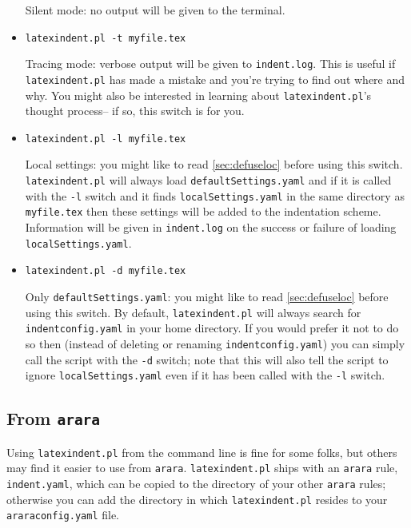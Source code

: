 \begin{itemize}[labelsep=.5cm]
	Silent mode: no output will be given to the terminal.
	\item[\verbitem{-t}] \lstinline!latexindent.pl -t myfile.tex!
														 		 		 		 		 					
	Tracing mode: verbose output will be given to \lstinline!indent.log!. This 
	is useful if \lstinline!latexindent.pl! has made a mistake and you're
	trying to find out where and why. You might also be interested in learning
    about \lstinline!latexindent.pl!'s thought process-- if so, this 
    switch is for you.
	\item[\verbitem{-l}] \lstinline!latexindent.pl -l myfile.tex!
														 		 		 		 		 					
	\label{page:localswitch}
	Local settings: you might like to read \cref{sec:defuseloc} before 
	using this switch. \lstinline!latexindent.pl! will always load \lstinline!defaultSettings.yaml!
	and if it is called with the \lstinline!-l! switch and it finds \lstinline!localSettings.yaml! 
	in the same directory as \lstinline!myfile.tex! then these settings will be 
	added to the indentation scheme. Information will be given in \lstinline!indent.log! on 
	the success or failure of loading \lstinline!localSettings.yaml!.
	\item[\verbitem{-d}] \lstinline!latexindent.pl -d myfile.tex!
	
	Only \lstinline!defaultSettings.yaml!: you might like to read \cref{sec:defuseloc} before 
	using this switch. By default, \lstinline!latexindent.pl! will always search for 
	\lstinline!indentconfig.yaml! in your home directory. If you would prefer it not to do so
	then (instead of deleting or renaming \lstinline!indentconfig.yaml!) you can simply 
	call the script with the \lstinline!-d! switch; note that this will also tell 
	the script to ignore \lstinline!localSettings.yaml! even if it has been called with the 
	\lstinline!-l! switch.
\end{itemize}
\subsection{From \lstinline!arara!}
Using \lstinline!latexindent.pl! from the command line is fine for some folks, but
others may find it easier to use from \lstinline!arara!. \lstinline!latexindent.pl!
ships with an \lstinline!arara! rule, \lstinline!indent.yaml!, which can be copied 
to the directory of
your other \lstinline!arara! rules; otherwise  you can add the directory in which \lstinline!latexindent.pl!
resides to your \lstinline!araraconfig.yaml! file.
 	 	 	 	 	
